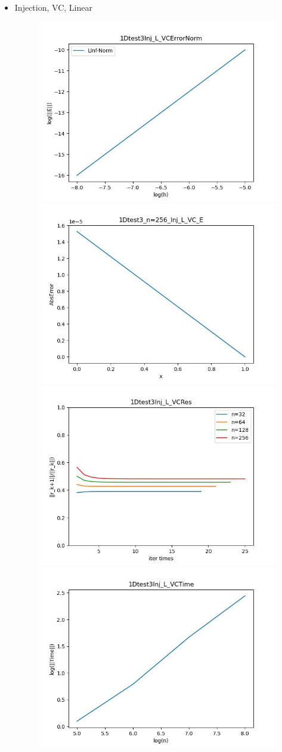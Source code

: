 \documentclass{article}
\begin{document}
\begin{itemize}
    \item Injection, VC, Linear
    \begin{figure}[h]
        \centering
        \includegraphics[width=0.35\linewidth]{1Dtest3Inj_L_VCErrorNorm.jpg}
        \includegraphics[width=0.35\linewidth]{1Dtest3_n=256_Inj_L_VC_E.jpg}
        \includegraphics[width=0.35\linewidth]{1Dtest3Inj_L_VCRes.jpg}
        \includegraphics[width=0.35\linewidth]{1Dtest3Inj_L_VCTime.jpg}
    \end{figure}
    

\end{itemize}
\end{document}
